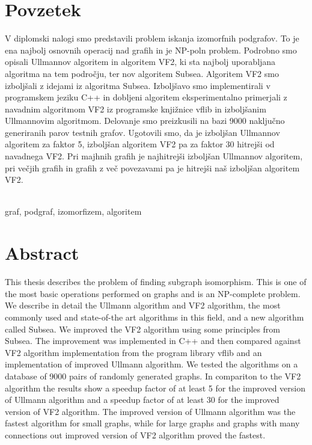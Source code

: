 \documentclass[a4paper, 12pt, ]{book}
\newcommand{\clearemptydoublepage}{\newpage{\pagestyle{empty}\cleardoublepage}}
\begin{document}
	\clearemptydoublepage
	

	
	
	
	\chapter*{Povzetek}
	V diplomski nalogi smo predstavili problem iskanja izomorfnih podgrafov. To je ena najbolj osnovnih operacij nad grafih in je NP-poln problem.
	Podrobno smo opisali Ullmannov algoritem in algoritem VF2, ki sta najbolj uporabljana algoritma na tem področju, ter nov algoritem Subsea. Algoritem
	VF2 smo izboljšali z idejami iz algoritma Subsea. Izboljšavo smo implementirali v programskem jeziku C++ in dobljeni algoritem eksperimentalno 
	primerjali z navadnim algoritmom VF2 iz programske knjižnice vflib in izboljšanim Ullmannovim algoritmom. Delovanje smo preizkusili na bazi 9000
	naključno generiranih parov testnih grafov. Ugotovili smo, da je izboljšan Ullmannov algoritem za faktor 5, izboljšan algoritem VF2 pa za faktor 30 hitrejši
	od navadnega VF2. Pri majhnih grafih je najhitrejši izboljšan Ullmannov algoritem, pri večjih grafih in grafih z več povezavami pa je hitrejši naš izboljšan
	algoritem VF2.

	
	\vspace{2cm}
	\\
	graf, podgraf, izomorfizem, algoritem
	
	
	\clearemptydoublepage
	
	
	
	
	
	\chapter*{Abstract}
	This thesis describes the problem of finding subgraph isomorphism. This is one of the most basic operations performed on graphs and is an NP-complete
	problem. We describe in detail the Ullmann algorithm and VF2 algorithm, the most commonly used and state-of-the art algorithms in this field, and a new 
	algorithm called Subsea. We improved the VF2 algorithm using some principles from Subsea. The improvement was implemented in C++ and then
	compared against VF2 algorithm implementation from the program library vflib and an implementation of improved Ullmann algorithm. We tested the
	algorithms on a database of 9000 pairs of randomly generated graphs. In compariton to the VF2 algorithm the results show a speedup factor of at least 5 	
	for the improved version of Ullmann algorithm and a speedup factor of at least 30 for the improved version of VF2 algorithm. The improved version of
	Ullmann algorithm was the fastest algorithm for small graphs, while for large graphs and graphs with many connections out improved version of VF2 
	algorithm proved the fastest.
	
\end{document}
